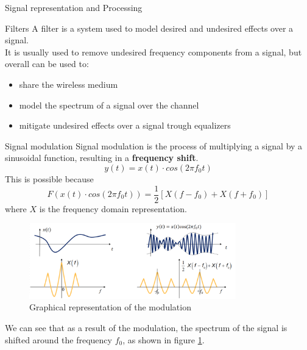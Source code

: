 \begin{section}{Signal representation and Processing}
  \begin{subsection}{Filters}
    A filter is a system used to model desired and undesired effects over a signal.\\
    It is usually used to remove undesired frequency components from a signal, but overall can be
    used to:
    \begin{itemize}
      \item share the wireless medium
      \item model the spectrum of a signal over the channel
      \item mitigate undesired effects over a signal trough equalizers
    \end{itemize}
    \end{subsection}
    \begin{subsection}{Signal modulation}
      Signal modulation is the process of multiplying a signal by a sinusoidal function, resulting
      in a \textbf{frequency shift}.
      \begin{equation}
        y(t) = x(t) \cdot cos(2\pi f_0 t)
      \end{equation}
      This is possible because
      \begin{equation}
        F(x(t) \cdot cos(2\pi f_0 t)) = \frac{1}{2}[X(f-f_0) + X(f+f_0)]
      \end{equation}
      where $X$ is the frequency domain representation.\\ 
      \begin{figure}[h]
        \centering
        \includegraphics[width=0.8\textwidth]{img/wireless/signal modulation.png}
        \caption{Graphical representation of the modulation}
        \label{fig:Modulation}
      \end{figure}
      We can see that as a result of the modulation, the spectrum of the signal is shifted around
      the frequency $f_0$, as shown in figure \ref{fig:Modulation}.\\


\end{subsection}
\end{section}
